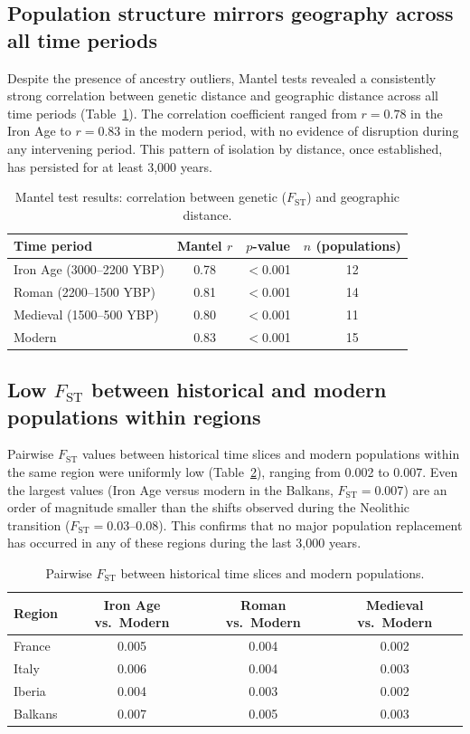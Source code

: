 \documentclass[11pt]{article}
\begin{document}
\subsection{Population structure mirrors geography across all time periods}
Despite the presence of ancestry outliers, Mantel tests revealed a consistently strong correlation between genetic distance and geographic distance across all time periods (Table~\ref{tab:mantel}). The correlation coefficient ranged from $r = 0.78$ in the Iron Age to $r = 0.83$ in the modern period, with no evidence of disruption during any intervening period. This pattern of isolation by distance, once established, has persisted for at least 3,000 years.

\begin{table}[h]
\centering
\caption{Mantel test results: correlation between genetic ($F_\text{ST}$) and geographic distance.}
\label{tab:mantel}
\begin{tabular}{lccc}
\toprule
Time period & Mantel $r$ & $p$-value & $n$ (populations) \\
\midrule
Iron Age (3000--2200 YBP) & 0.78 & $<$0.001 & 12 \\
Roman (2200--1500 YBP) & 0.81 & $<$0.001 & 14 \\
Medieval (1500--500 YBP) & 0.80 & $<$0.001 & 11 \\
Modern & 0.83 & $<$0.001 & 15 \\
\bottomrule
\end{tabular}
\end{table}

\subsection{Low $F_\text{ST}$ between historical and modern populations within regions}
Pairwise $F_\text{ST}$ values between historical time slices and modern populations within the same region were uniformly low (Table~\ref{tab:fst}), ranging from 0.002 to 0.007. Even the largest values (Iron Age versus modern in the Balkans, $F_\text{ST} = 0.007$) are an order of magnitude smaller than the shifts observed during the Neolithic transition ($F_\text{ST} = 0.03$--$0.08$). This confirms that no major population replacement has occurred in any of these regions during the last 3,000 years.

\begin{table}[h]
\centering
\caption{Pairwise $F_\text{ST}$ between historical time slices and modern populations.}
\label{tab:fst}
\begin{tabular}{lccc}
\toprule
Region & Iron Age vs.\ Modern & Roman vs.\ Modern & Medieval vs.\ Modern \\
\midrule
France & 0.005 & 0.004 & 0.002 \\
Italy & 0.006 & 0.004 & 0.003 \\
Iberia & 0.004 & 0.003 & 0.002 \\
Balkans & 0.007 & 0.005 & 0.003 \\
\bottomrule
\end{tabular}
\end{table}
\end{document}
